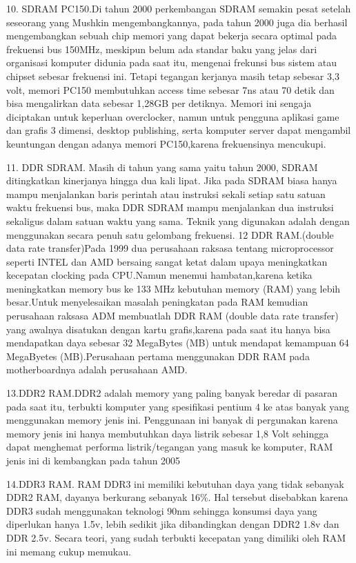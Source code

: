 10.	SDRAM PC150.Di tahun 2000 perkembangan SDRAM semakin pesat setelah seseorang yang Mushkin mengembangkannya, pada tahun 2000 juga dia berhasil mengembangkan sebuah chip memori yang dapat bekerja secara optimal pada frekuensi bus 150MHz, meskipun belum ada standar baku yang jelas dari organisasi komputer didunia pada saat itu, mengenai frekunsi bus sistem atau chipset sebesar frekuensi ini. Tetapi tegangan kerjanya masih tetap sebesar 3,3 volt, memori PC150 membutuhkan access time sebesar 7ns atau 70 detik dan bisa mengalirkan data sebesar 1,28GB per detiknya. Memori ini sengaja diciptakan untuk keperluan overclocker, namun untuk pengguna aplikasi game dan grafis 3 dimensi, desktop publishing, serta komputer server dapat mengambil keuntungan dengan adanya memori PC150,karena frekuensinya mencukupi.

11.	DDR SDRAM. Masih di tahun yang sama yaitu tahun 2000, SDRAM ditingkatkan kinerjanya hingga dua kali lipat. Jika pada SDRAM biasa hanya mampu menjalankan baris perintah atau instruksi sekali setiap satu satuan waktu frekuensi bus, maka DDR SDRAM mampu menjalankan dua instruksi sekaligus dalam satuan waktu yang sama. Teknik yang digunakan adalah dengan menggunakan secara penuh satu gelombang frekuensi.
12	DDR RAM.(double data rate transfer)Pada 1999 dua perusahaan raksasa tentang microprocessor seperti INTEL dan AMD bersaing sangat ketat dalam upaya meningkatkan kecepatan clocking pada CPU.Namun menemui hambatan,karena ketika meningkatkan memory bus ke 133 MHz kebutuhan memory (RAM) yang lebih besar.Untuk menyelesaikan masalah peningkatan pada RAM kemudian perusahaan raksasa ADM membuatlah DDR RAM (double data rate transfer) yang awalnya disatukan dengan kartu grafis,karena pada saat itu hanya bisa mendapatkan daya sebesar 32 MegaBytes (MB) untuk mendapat kemampuan 64 MegaByetes (MB).Perusahaan pertama menggunakan DDR RAM pada motherboardnya adalah perusahaan AMD.

13.DDR2 RAM.DDR2 adalah memory yang paling banyak beredar di pasaran pada saat itu, terbukti komputer yang spesifikasi pentium 4 ke atas banyak yang menggunakan memory jenis ini. Penggunaan ini banyak di pergunakan karena memory jenis ini hanya membutuhkan daya listrik sebesar 1,8 Volt sehingga dapat menghemat performa listrik/tegangan yang masuk ke komputer, RAM jenis ini di kembangkan pada tahun 2005

14.DDR3 RAM. RAM DDR3 ini memiliki kebutuhan daya yang tidak sebanyak DDR2 RAM, dayanya berkurang sebanyak 16\%. Hal tersebut disebabkan karena DDR3 sudah menggunakan teknologi 90nm sehingga konsumsi daya yang diperlukan hanya 1.5v, lebih sedikit jika dibandingkan dengan DDR2 1.8v dan DDR 2.5v. Secara teori, yang sudah terbukti kecepatan yang dimiliki oleh RAM ini memang cukup memukau.